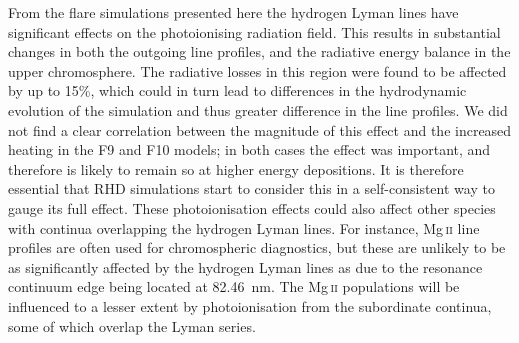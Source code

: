 From the flare simulations presented here the hydrogen Lyman lines have significant effects on the \Caii{} photoionising radiation field.
This results in substantial changes in both the outgoing \CaLine{} line profiles, and the radiative energy balance in the upper chromosphere.
The radiative losses in this region were found to be affected by up to 15\%, which could in turn lead to differences in the hydrodynamic evolution of the simulation and thus greater difference in the line profiles.
We did not find a clear correlation between the magnitude of this effect and the increased heating in the F9 and F10 models; in both cases the effect was important, and therefore is likely to remain so at higher energy depositions.
It is therefore essential that RHD simulations start to consider this in a self-consistent way to gauge its full effect.
These photoionisation effects could also affect other species with continua overlapping the hydrogen Lyman lines.
For instance, Mg\,\textsc{ii} line profiles are often used for chromospheric diagnostics, but these are unlikely to be as significantly affected by the hydrogen Lyman lines as \Caii{} due to the resonance continuum edge being located at \SI{82.46}{\nano\metre}.
The Mg\,\textsc{ii} populations will be influenced to a lesser extent by photoionisation from the subordinate continua, some of which overlap the Lyman series.

